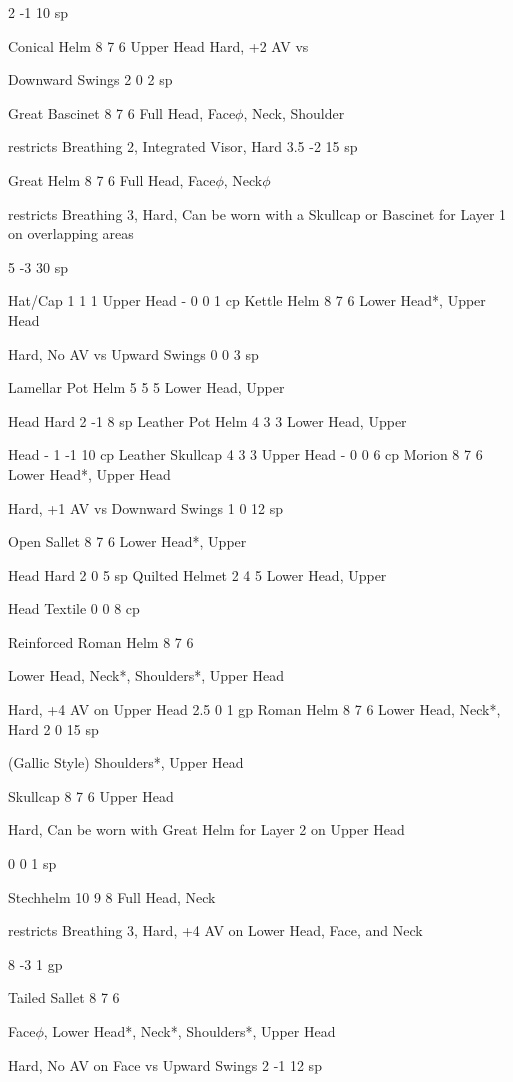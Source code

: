 \documentclass[oneside,11pt,english]{book}
\begin{document}
2 -1 10 sp

Conical Helm 8 7 6 Upper Head Hard, +2 AV vs 

Downward Swings 2 0 2 sp

Great Bascinet 8 7 6 Full Head, Face$\phi$, Neck, 
Shoulder

restricts Breathing 2, 
Integrated Visor, Hard 3.5 -2 15 sp

Great Helm 8 7 6 Full Head, Face$\phi$, Neck$\phi$

restricts Breathing 3, 
Hard, Can be worn with a
Skullcap or Bascinet for 
Layer 1 on overlapping 
areas

5 -3 30 sp

Hat/Cap 1 1 1 Upper Head - 0 0 1 cp
Kettle Helm 8 7 6 Lower Head*, Upper 
Head

Hard, No AV vs Upward 
Swings 0 0 3 sp

Lamellar Pot Helm 5 5 5 Lower Head, Upper 

Head Hard 2 -1 8 sp
Leather Pot Helm 4 3 3 Lower Head, Upper 

Head - 1 -1 10 cp
Leather Skullcap 4 3 3 Upper Head - 0 0 6 cp
Morion 8 7 6 Lower Head*, Upper 
Head

Hard, +1 AV vs 
Downward Swings 1 0 12 sp

Open Sallet 8 7 6 Lower Head*, Upper 

Head Hard 2 0 5 sp
Quilted Helmet 2 4 5 Lower Head, Upper 

Head Textile 0 0 8 cp

Reinforced Roman 
Helm 8 7 6

Lower Head, Neck*, 
Shoulders*, Upper Head

Hard, +4 AV on Upper 
Head 2.5 0 1 gp
Roman Helm 8 7 6 Lower Head, Neck*, Hard 2 0 15 sp


(Gallic Style) Shoulders*, Upper Head

Skullcap 8 7 6 Upper Head

Hard, Can be worn with 
Great Helm for Layer 2 
on Upper Head

0 0 1 sp

Stechhelm 10 9 8 Full Head, Neck

restricts Breathing 3, 
Hard, +4 AV on Lower 
Head, Face, and Neck 

8 -3 1 gp

Tailed Sallet 8 7 6

Face$\phi$, Lower Head*, 
Neck*, Shoulders*, 
Upper Head

Hard, No AV on Face vs 
Upward Swings 2 -1 12 sp
\end{document}
